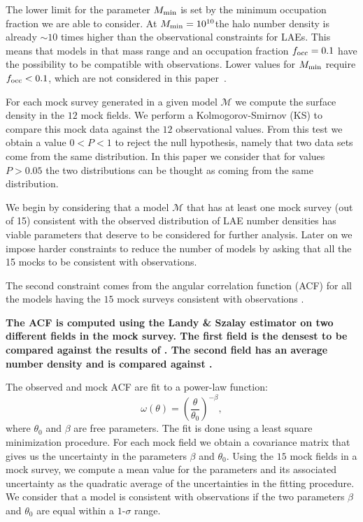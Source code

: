 \documentclass[usenatbib]{mn2e}
\newcommand{\documentname}{paper~}
\newcommand{\hMsun}{{\ifmmode{h^{-1}{\rm
        {M_{\odot}}}}\else{$h^{-1}{\rm{M_{\odot}}}$}\fi}}
\begin{document}
The lower limit for the parameter $M_{\rm min}$ is set by the minimum
occupation fraction we are able to consider. At $M_{\rm
  min}=10^{10}$\hMsun the halo number density is already $\sim 10$
times higher than the observational constraints for LAEs. This means
that models in that mass range and an occupation fraction $f_{\rm
  occ}=0.1$ have the possibility to be compatible with observations. Lower
values for $M_{\rm min}$ require $f_{\rm occ}<0.1$, which are not
considered in this \documentname. 

For each mock survey generated in a given model ${\mathcal M}$ we
compute the surface density in the $12$ mock fields. We perform a
Kolmogorov-Smirnov (KS) to compare this mock data against the $12$
observational values. From this test we obtain a value $0<P<1$ to
reject the null hypothesis, namely that two data sets come from the
same distribution. In this paper we consider that for values $P>0.05$
the two distributions can be thought as coming from the same
distribution.

We begin by considering that  a model ${\mathcal M}$ that has at least
one mock survey (out of 15) consistent with the observed
distribution of LAE number densities has viable parameters that
deserve to be considered for further analysis. Later on we impose
harder constraints to reduce the number of models by asking that all
the 15 mocks to be consistent with observations.

The second constraint  comes from the angular correlation function (ACF)
for all the models having the $15$ mock surveys consistent with
observations . 

{\bf The ACF is computed using  the Landy \&  Szalay estimator
  \citep{Landy1993}  on two different  fields in the mock survey. The
  first field is the densest to be compared against the results of
  \cite{Hayashino2004}. The second field has an average number density and is compared against \cite{Ouchi2010}.}

The observed and mock ACF are fit to a power-law function:
\begin{equation}
\omega(\theta) = \left(\frac{\theta}{\theta_{0}}\right)^{-\beta}, 
\label{eq:fitting}
\end{equation}
where $\theta_0$ and $\beta$ are free parameters. The fit is done
using a least square minimization procedure. For each mock field we obtain a
covariance matrix that gives us the uncertainty in the parameters $\beta$ and
$\theta_0$. Using the $15$ mock fields in a mock survey, we compute a
mean value for the parameters and its associated uncertainty as the
quadratic average of the uncertainties in the fitting procedure. We
consider that a model is consistent with observations if the two
parameters $\beta$ and $\theta_0$ are equal within a $1$-$\sigma$
range.   
\end{document}
